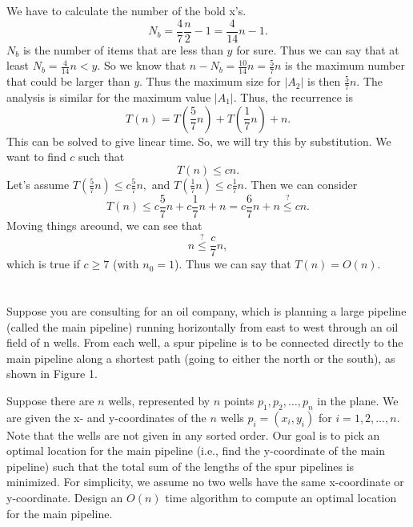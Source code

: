 \documentclass{article}
\begin{document}
We have to calculate the number of the bold x's. 
\begin{equation*}
  N_b = \frac{4}{7}\frac{n}{2} - 1 = \frac{4}{14}n - 1.
\end{equation*}
$N_b$ is the number of items that are less than $y$ for sure. Thus we
can say that at least $N_b = \frac{4}{14}n < y$. So we know that
$n-N_b = \frac{10}{14}n = \frac{5}{7}n$ is the maximum number that could
be larger than $y$. Thus the maximum size for $\left| A_2\right|$ is
then $\frac{5}{7}n$.
The analysis is similar for the maximum value $\left|A_1\right|$.
Thus, the recurrence is 
\begin{equation*}
  T(n) = T\left(\frac{5}{7}n\right) + T\left(\frac{1}{7}n\right) + n.
\end{equation*}
This can be solved to give linear time. So, we will try this by
substitution.
We want to find $c$ such that 
\begin{equation*}
  T(n) \le cn.
\end{equation*}
Let's assume $T\left(\frac{5}{7}n\right) \le c\frac{5}{7}n,$ and
$T\left(\frac{1}{7}n\right) \le c\frac{1}{7}n.$  Then we can consider
\begin{equation*}
  T(n) \le c\frac{5}{7}n + c\frac{1}{7}n + n  = c\frac{6}{7}n + n
  \stackrel{?}{\le} cn. 
\end{equation*}
Moving things areound, we can see that 
\begin{equation*}
  n \stackrel{?}{\le} \frac{c}{7}n,
\end{equation*}
which is true if $c \ge 7$ (with $n_0 = 1$).  Thus we can say that 
$T(n) = O(n)$.



\section{}
Suppose you are consulting for an oil company, which is planning a
large pipeline (called the main pipeline) running horizontally from
east to west through an oil field of n wells. From each well, a spur
pipeline is to be connected directly to the main pipeline along a
shortest path (going to either the north or the south), as shown in
Figure 1. 

Suppose there are $n$ wells, represented by $n$ points $p_1, p_2,
\dots , p_n$ in the plane. We are given the x- and y-coordinates of the
$n$ wells $p_i = (x_i , y_i)$ for $i = 1, 2, \dots, n$. Note that the
wells are not given in any sorted order. Our goal is to pick an
optimal location for the main pipeline (i.e., find the y-coordinate of
the main pipeline) such that the total sum of the lengths of the spur
pipelines is minimized. For simplicity, we assume no two wells have
the same x-coordinate or y-coordinate. Design an $O(n)$ time algorithm
to compute an optimal location for the main pipeline.
\end{document}
